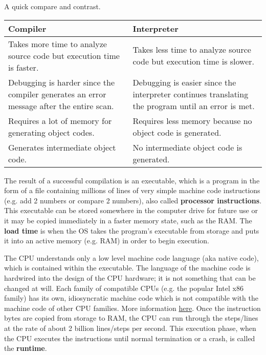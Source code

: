   A quick compare and contrast.
  \begin{table}
  \centering
  \begin{tabular}{|p{7cm}|p{7cm}|}
  \hline
  \textbf{Compiler} & \textbf{Interpreter} \\
  \hline
  Takes more time to analyze source code but execution time is faster. & Takes less time to analyze source code but execution time is slower. \\
  \hline
  Debugging is harder since the compiler generates an error message after the entire scan. & Debugging is easier since the interpreter continues translating the program until an error is met. \\
  \hline
  Requires a lot of memory for generating object codes. & Requires less memory because no object code is generated. \\
  \hline
  Generates intermediate object code. & No intermediate object code is generated. \\
  \hline
  \end{tabular}
  \end{table}

  The result of a successful compilation is an executable, which is a program in the form of a file containing millions of lines of very simple machine code instructions (e.g. add 2 numbers or compare 2 numbers), also called \textbf{processor instructions}. This executable can be stored somewhere in the computer drive for future use or it may be copied immediately in a faster memory state, such as the RAM. The \textbf{load time} is when the OS takes the program's executable from storage and puts it into an active memory (e.g. RAM) in order to begin execution. 

  The CPU understands only a low level machine code language (aka native code), which is contained within the executable. The language of the machine code is hardwired into the design of the CPU hardware; it is not something that can be changed at will. Each family of compatible CPUs (e.g. the popular Intel x86 family) has its own, idiosyncratic machine code which is not compatible with the machine code of other CPU families. More information \href{https://web.stanford.edu/class/cs101/software-1.html}{here}. Once the instruction bytes are copied from storage to RAM, the CPU can run through the steps/lines at the rate of about 2 billion lines/steps per second. This execution phase, when the CPU executes the instructions until normal termination or a crash, is called the \textbf{runtime}.

